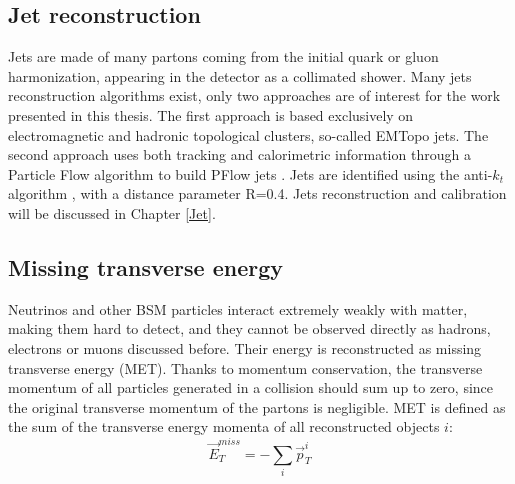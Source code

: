 \subsection{Jet reconstruction}
\label{chap2:Objects:Jet}
Jets are made of many partons coming from the initial quark or gluon harmonization, appearing in the detector as a collimated shower. Many jets reconstruction algorithms exist, only two approaches are of interest for the work presented in this thesis. The first approach is based exclusively on electromagnetic and hadronic topological clusters, so-called EMTopo jets. The second approach uses both tracking and calorimetric information through a Particle Flow algorithm to build PFlow jets \cite{Jet_Perf_Run2}. Jets are identified using the anti-$k_t$ algorithm \cite{Anti-Kt}, with a distance parameter R=0.4. Jets reconstruction and calibration will be discussed in Chapter \ref{Jet}. 

\subsection{Missing transverse energy}
\label{chap2:Objects:MET}
Neutrinos and other BSM particles interact extremely weakly with matter, making them hard to detect, and they cannot be observed directly as hadrons, electrons or muons discussed before. Their energy is reconstructed as missing transverse energy (MET). Thanks to momentum conservation, the transverse momentum of all particles generated in a collision should sum up to zero, since the original transverse momentum of the partons is negligible. MET is defined as the sum of the transverse energy momenta of all reconstructed objects $i$: 
\begin{equation}
    \vec{E}_{T}^{m i s s}=-\sum_{i} \vec{p}_{T}^{i}
\end{equation}
